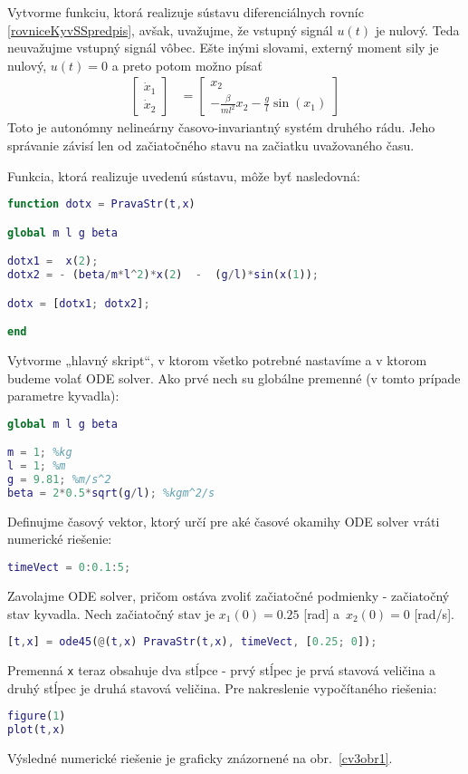 \documentclass[a4paper, 10pt, ]{article}
\begin{document}
Vytvorme funkciu, ktorá realizuje sústavu diferenciálnych rovníc \eqref{rovniceKyvSSpredpis}, avšak, uvažujme, že vstupný signál $u(t)$ je nulový. Teda neuvažujme vstupný signál vôbec. Ešte inými slovami, externý moment sily je nulový, $u(t) = 0$ a preto potom možno písať
\begin{align} \label{fajnVektRov0}
	\begin{bmatrix}
		\dot{x}_1 \\ \dot{x}_2
	\end{bmatrix}
	&=
	\begin{bmatrix}
		x_2 \\ - \frac{\beta}{ml^2} x_2 - \frac{g}{l} \sin(x_1)
	\end{bmatrix}
\end{align}
Toto je autonómny nelineárny časovo-invariantný systém druhého rádu. Jeho správanie závisí len od začiatočného stavu na začiatku uvažovaného času.

Funkcia, ktorá realizuje uvedenú sústavu, môže byť nasledovná:

\lstset{style=mystyle}
\begin{lstlisting}[language=Matlab, title=Celý súbor PravaStr.m]
function dotx = PravaStr(t,x)

global m l g beta

dotx1 =  x(2);
dotx2 = - (beta/m*l^2)*x(2)  -  (g/l)*sin(x(1));

dotx = [dotx1; dotx2];

end
\end{lstlisting}



Vytvorme „hlavný skript“, v ktorom všetko potrebné nastavíme a v ktorom budeme volať ODE solver. Ako prvé nech su globálne premenné (v tomto prípade parametre kyvadla):
\begin{lstlisting}[language=Matlab, title=Časť súbora hlSkript.m, name=hlSkript]
global m l g beta

m = 1; %kg
l = 1; %m
g = 9.81; %m/s^2
beta = 2*0.5*sqrt(g/l); %kgm^2/s
\end{lstlisting}
Definujme časový vektor, ktorý určí pre aké časové okamihy ODE solver vráti numerické riešenie:
\begin{lstlisting}[language=Matlab, title=Časť súbora hlSkript.m, name=hlSkript]
timeVect = 0:0.1:5;
\end{lstlisting}
Zavolajme ODE solver, pričom ostáva zvoliť začiatočné podmienky - začiatočný stav kyvadla. Nech začiatočný stav je $x_1(0) = 0.25$ [rad] a~$x_2(0) = 0$ [rad/s].
\begin{lstlisting}[language=Matlab, title=Časť súbora hlSkript.m, name=hlSkript]
[t,x] = ode45(@(t,x) PravaStr(t,x), timeVect, [0.25; 0]);
\end{lstlisting}
Premenná \verb|x| teraz obsahuje dva stĺpce - prvý stĺpec je prvá stavová veličina a druhý stĺpec je druhá stavová veličina.
Pre nakreslenie vypočítaného riešenia:
\begin{lstlisting}[language=Matlab, title=Časť súbora hlSkript.m, name=hlSkript]
figure(1)
plot(t,x)
\end{lstlisting}
Výsledné numerické riešenie je graficky znázornené na obr.~\ref{cv3obr1}.
\end{document}
